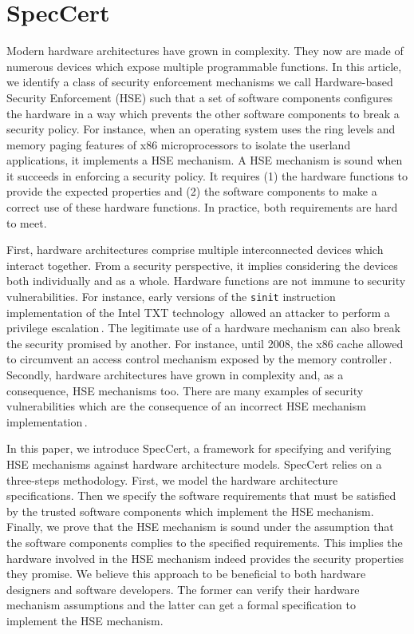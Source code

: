 \chapter{SpecCert}

Modern hardware architectures have grown in complexity. They now are made of
numerous devices which expose multiple programmable functions. In this article,
we identify a class of security enforcement mechanisms we call Hardware-based
Security Enforcement (HSE) such that a set of software components configures the
hardware in a way which prevents the other software components to break a
security policy. For instance, when an operating system uses the ring levels and
memory paging features of x86 microprocessors to isolate the userland
applications, it implements a HSE mechanism. A HSE mechanism is sound when it
succeeds in enforcing a security policy. It requires (1) the hardware functions
to provide the expected properties and (2) the software components to make a
correct use of these hardware functions. In practice, both requirements are hard
to meet.

First, hardware architectures comprise multiple interconnected devices which
interact together. From a security perspective, it implies considering the
devices both individually and as a whole. Hardware functions are not immune to
security vulnerabilities. For instance, early versions of the \texttt{sinit}
instruction implementation of the Intel TXT technology\,\cite{intel2015txt}
allowed an attacker to perform a privilege
escalation\,\cite{wojtczuk2011txtbug}. The legitimate use of a hardware
mechanism can also break the security promised by another. For instance, until
2008, the x86 cache allowed to circumvent an access control mechanism exposed by
the memory controller\,\cite{wojtczuk2009smram,duflot2009smram}.  Secondly,
hardware architectures have grown in complexity and, as a consequence, HSE
mechanisms too. There are many examples of security vulnerabilities which are
the consequence of an incorrect HSE mechanism
implementation\,\cite{kallenberg2014failure,bulygin2014bios,intel2014chipsec}.

In this paper, we introduce SpecCert, a framework for specifying and verifying
HSE mechanisms against hardware architecture models. SpecCert relies on a
three-steps methodology. First, we model the hardware architecture
specifications. Then we specify the software requirements that must be satisfied
by the trusted software components which implement the HSE mechanism. Finally,
we prove that the HSE mechanism is sound under the assumption that the software
components complies to the specified requirements. This implies the hardware
involved in the HSE mechanism indeed provides the security properties they
promise. We believe this approach to be beneficial to both hardware designers
and software developers.  The former can verify their hardware mechanism
assumptions and the latter can get a formal specification to implement the HSE
mechanism.

